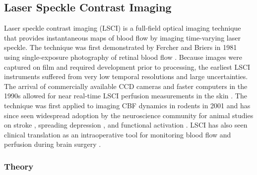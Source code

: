 \subsection{Laser Speckle Contrast Imaging}

Laser speckle contrast imaging (LSCI) is a full-field optical imaging technique that provides instantaneous maps of blood flow by imaging time-varying laser speckle. The technique was first demonstrated by Fercher and Briers in 1981 using single-exposure photography of retinal blood flow \cite{Fercher:1981jh}. Because images were captured on film and required development prior to processing, the earliest LSCI instruments suffered from very low temporal resolutions and large uncertainties. The arrival of commercially available CCD cameras and faster computers in the 1990s allowed for near real-time LSCI perfusion measurements in the skin \cite{Briers:1995iu, Briers:1996kfa}. The technique was first applied to imaging CBF dynamics in rodents in 2001 \cite{Dunn:2001dj} and has since seen widespread adoption by the neuroscience community for animal studies on stroke \cite{Ayata:2004ba, Strong:2005kj, Armitage:2010ga}, spreading depression \cite{Ayata:2004ck, Shin:2006dc}, and functional activation \cite{Dunn:2005gw, Durduran:2016el}. LSCI has also seen clinical translation as an intraoperative tool for monitoring blood flow and perfusion during brain surgery \cite{Hecht:2009gu, Parthasarathy:2010gh}.

\subsubsection{Theory}

